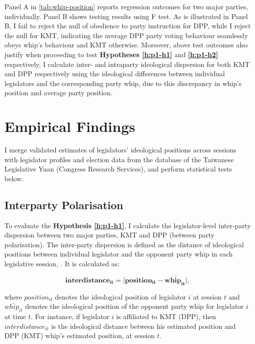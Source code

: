 

Panel A in \autoref{tab:whip-position} reports regression outcomes for two major parties, individually. Panel B shows testing results using F test. As is illustrated in Panel B, I fail to reject the null of obedience to party instruction for DPP, while I reject the null for KMT, indicating the average DPP party voting behaviour seamlessly obeys whip's behaviour and KMT otherwise. Moreover, above test outcomes also justify when proceeding to test \textbf{Hypotheses \ref{h:p1-h1}} and \textbf{\ref{h:p1-h2}} respectively, I calculate inter- and intraparty ideological dispersion for both KMT and DPP respectively using the ideological differences between individual legislators and the corresponding party whip, due to this discrepancy in whip's position and average party position.




\section*{\centering Empirical Findings}

I merge validated estimates of legislators' ideological positions across sessions with legislator profiles and election data from the database of the Taiwanese Legislative Yuan (Congress Research Services), and perform statistical tests below.

\subsection*{Interparty Polarisation\label{subsec:political-polarization}}

To evaluate the \textbf{Hypothesis \ref{h:p1-h1}}, I calculate the legislator-level inter-party dispersion between two major parties, KMT and DPP (between party polarisation). The inter-party dispersion is defined as the distance of ideological positions between individual legislator and the opponent party whip in each legislative session, . It is calculated as: 

\begin{equation}
\mathbf{interdistance_{it}=|position_{it}-\bar{whip_{it}|}},
\end{equation}

\noindent where $position_{it}$ denotes the ideological position of legislator $i$ at session $t$ and $\bar{whip_{it}}$ denotes the ideological position of the opponent party whip for legislator $i$ at time $t$. For instance, if legislator $i$ is affiliated to KMT (DPP), then $interdistance_{it}$ is the ideological distance between his estimated position and DPP (KMT) whip's estimated position, at session $t$.

